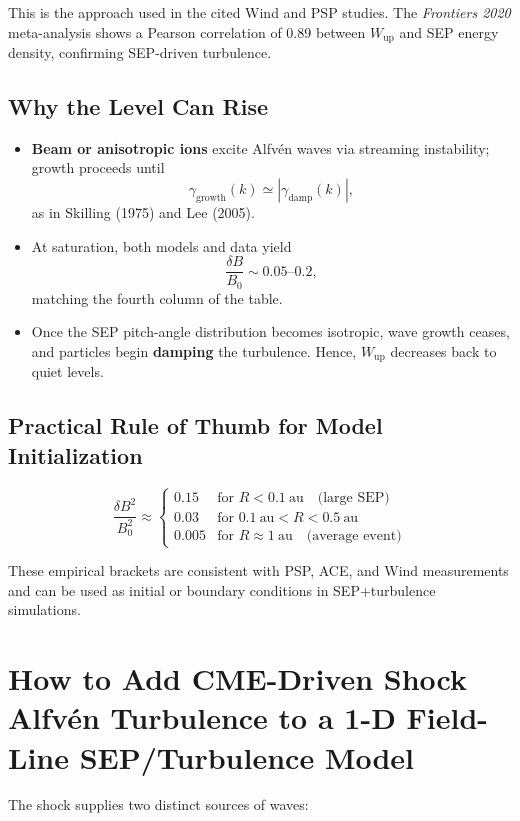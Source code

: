 This is the approach used in the cited Wind and PSP studies. The \textit{Frontiers 2020} meta-analysis shows a Pearson correlation of 0.89 between $W_{\text{up}}$ and SEP energy density, confirming SEP-driven turbulence.

\subsection*{Why the Level Can Rise}

\begin{itemize}
  \item \textbf{Beam or anisotropic ions} excite Alfvén waves via streaming instability; growth proceeds until
  \[
  \gamma_{\text{growth}}(k) \simeq |\gamma_{\text{damp}}(k)|,
  \]
  as in Skilling (1975) and Lee (2005).
  \item At saturation, both models and data yield
  \[
  \frac{\delta B}{B_0} \sim 0.05\text{–}0.2,
  \]
  matching the fourth column of the table.
  \item Once the SEP pitch-angle distribution becomes isotropic, wave growth ceases, and particles begin \textbf{damping} the turbulence. Hence, $W_{\text{up}}$ decreases back to quiet levels.
\end{itemize}

\subsection*{Practical Rule of Thumb for Model Initialization}

\[
\frac{\delta B^2}{B_0^2} \approx
\begin{cases}
0.15  & \text{for } R < 0.1~\text{au} \quad \text{(large SEP)} \\
0.03  & \text{for } 0.1~\text{au} < R < 0.5~\text{au} \\
0.005 & \text{for } R \approx 1~\text{au} \quad \text{(average event)}
\end{cases}
\]

These empirical brackets are consistent with PSP, ACE, and Wind measurements and can be used as initial or boundary conditions in SEP+turbulence simulations.

\section*{How to Add CME-Driven Shock Alfvén Turbulence to a 1-D Field-Line SEP/Turbulence Model}

The shock supplies two distinct sources of waves:


